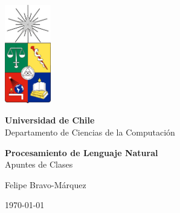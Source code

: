 \documentclass{book}
\begin{document}
\thispagestyle{empty}

\begin{titlepage}
    \begin{center}
        \vspace*{1cm}
        \includegraphics[width=2cm]{pics/escudocolor.png} %
        \vspace{1cm}
        
        {\Huge\textbf{Universidad de Chile}} \\
        \vspace{0.5cm}
        {\Large Departamento de Ciencias de la Computación} \\
        \vspace{2cm}
        
        {\Huge\textbf{Procesamiento de Lenguaje Natural}} \\
        \vspace{0.5cm}
        {\Large Apuntes de Clases} \\
        \vspace{2cm}
        
        {\Large Felipe Bravo-Márquez} \\
        \vspace{2cm}
        
        {\large \today}
    \end{center}
\end{titlepage}

\newpage

\thispagestyle{empty}
\mbox{}
\newpage



\tableofcontents 
\newpage

\listoftables
\newpage
\listoffigures
\newpage


\thispagestyle{empty}



\end{document}
